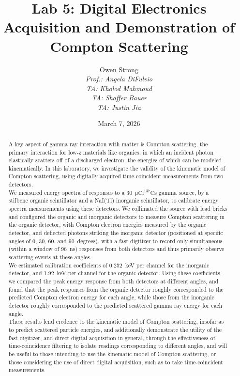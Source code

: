 \documentclass[12pt]{article}
\title{Lab 5: Digital Electronics Acquisition and Demonstration of Compton Scattering}
\author{Owen Strong \\
\itshape Prof.: Angela DiFulvio\\
\itshape TA: Kholod Mahmoud \\
\itshape TA: Shaffer Bauer \\
\itshape TA: Justin Jia \\
}
\date{March 7, 2026}
\newcommand{\micCi}{$\mathrm{\mu Ci}$\xspace}
\newcommand{\CsSrc}{$\mathrm{^{137}Cs}$\xspace}
\begin{document}
\maketitle
\pagebreak
{\hypersetup{linkcolor=black}\tableofcontents}
\pagebreak
{}
\begin{abstract}
    A key aspect of gamma ray interaction with matter is Compton scattering, the primary interaction for low-z materials like organics, in which an incident photon elastically scatters off of a discharged electron, the energies of which can be modeled kinematically.
    In this laboratory, we investigate the validity of the kinematic model of Compton scattering, using digitally acquired time-coincident measurements from two detectors.\\
    
    We measured energy spectra of responses to a 30~\micCi \CsSrc gamma source, by a stilbene organic scintillator and a NaI(Tl) inorganic scintillator, to calibrate energy spectra measurements using these detectors.
    We collimated the source with lead bricks and configured the organic and inorganic detectors to measure Compton scattering in the organic detector, with Compton electron energies measured by the organic detector, and deflected photons striking the inorganic detector (positioned at specific angles of 0, 30, 60, and 90~degrees), with a fast digitizer to record only simultaneous (within a window of 96~ns) responses from both detectors and thus primarily observe scattering events at these angles.\\

    We estimated calibration coefficients of 0.252~keV per channel for the inorganic detector, and 1.92~keV per channel for the organic detector.
    Using these coefficients, we compared the peak energy response from both detectors at different angles, and found that the peak responses from the organic detector roughly corresponded to the predicted Compton electron energy for each angle, while those from the inorganic detector roughly corresponded to the predicted scattered gamma ray energy for each angle.\\

    These results lend credence to the kinematic model of Compton scattering, insofar as to predict scattered particle energies, and additionally demonstrate the utility of the fast digitizer, and direct digital acquisition in general, through the effectiveness of time-coincidence filtering to isolate readings corresponding to different angles, and will be useful to those intending to use the kinematic model of Compton scattering, or those considering the use of direct digital acquisition, such as to take time-coincident measurements.

\end{abstract}
\end{document}
